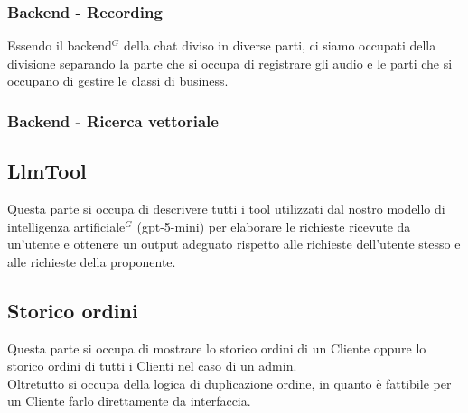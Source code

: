 

\newpage
\subsubsection{Backend - Recording}

Essendo il backend$^G$ della chat diviso in diverse parti, ci siamo occupati della divisione separando la parte che si occupa di registrare gli audio e le parti che si occupano di gestire le classi di business.



\newpage
\subsubsection{Backend - Ricerca vettoriale}



\newpage


\newpage
\subsection{LlmTool}
\label{tool}
Questa parte si occupa di descrivere tutti i tool utilizzati dal nostro modello di intelligenza artificiale$^G$ (gpt-5-mini) per elaborare le richieste ricevute da un'utente e ottenere un output adeguato rispetto alle richieste dell'utente stesso e alle richieste della proponente.



\newpage
\subsection{Storico ordini}

Questa parte si occupa di mostrare lo storico ordini di un Cliente oppure lo storico ordini di tutti i Clienti nel caso di un admin.\\
Oltretutto si occupa della logica di duplicazione ordine, in quanto è fattibile per un Cliente farlo direttamente da interfaccia.



\newpage
